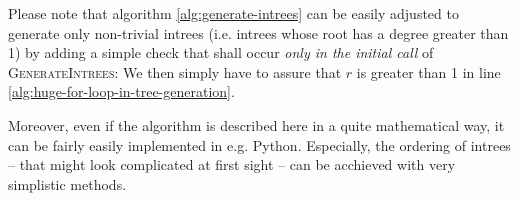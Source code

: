 Please note that algorithm \ref{alg:generate-intrees} can be easily adjusted to generate only non-trivial intrees (i.e. intrees whose root has a degree greater than 1) by adding a simple check that shall occur \emph{only in the initial call} of \textsc{GenerateIntrees}: We then simply have to assure that $r$ is greater than 1 in line \ref{alg:huge-for-loop-in-tree-generation}.

Moreover, even if the algorithm is described here in a quite mathematical way, it can be fairly easily implemented in e.g. Python. Especially, the ordering of intrees -- that might look complicated at first sight -- can be acchieved with very simplistic methods.

